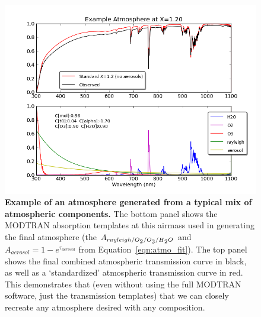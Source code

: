 \documentclass[12pt,preprint]{aastex}
\newcommand{\water}   {H\textsubscript{2}O}
\newcommand{\ozone}    {O\textsubscript{3}}
\newcommand{\oxy}     {O\textsubscript{2}}
\begin{document}

\begin{figure}[htb]
\centering
\includegraphics[width=6in]{atmo_airmass12}
\caption{{\small
{\bf Example of an atmosphere generated from a typical mix of
atmospheric components.} The bottom panel shows the MODTRAN absorption
templates at this airmass used in generating the final atmosphere
(the $A_{rayleigh/\oxy/\ozone/\water}$ and $A_{aerosol} = 1-e^{\tau_{aerosol}}$ from
Equation~\ref{eqn:atmo_fit}). The top panel shows the final combined atmospheric
transmission curve in black, as well as a `standardized' atmospheric transmission
curve in red. This demonstrates that (even without using the full
MODTRAN software, just the transmission templates) that we can closely
recreate any atmosphere desired with any composition.} }
\label{fig:absorption_comps2}
\end{figure}
\end{document}
